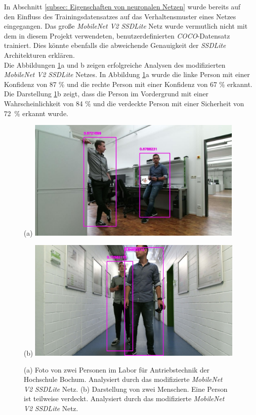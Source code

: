 In Abschnitt \ref{subsec: Eigenschaften von neuronalen Netzen} wurde bereits auf den Einfluss des Trainingsdatensatzes auf das Verhaltensmuster eines Netzes eingegangen. Das große \textit{MobileNet V2 SSDLite} Netz wurde vermutlich nicht mit dem in diesem Projekt verwendeten, benutzerdefinierten \textit{COCO}-Datensatz trainiert. Dies könnte ebenfalls die abweichende Genauigkeit der \textit{SSDLite} Architekturen erklären.\\


Die Abbildungen \ref{fig: owndatat}a und b zeigen erfolgreiche Analysen des modifizierten \textit{MobileNet V2 SSDLite} Netzes. In Abbildung \ref{fig: owndatat}a wurde die linke Person mit einer Konfidenz von 87 \% und die rechte Person mit einer Konfidenz von 67 \% erkannt. Die Darstellung \ref{fig: owndatat}b zeigt, dass die Person im Vordergrund mit einer Wahrscheinlichkeit von 84 \% und die verdeckte Person mit einer Sicherheit von {72~\%} erkannt wurde.  \\

	\begin{figure}[H]
	\centering
	\begin{minipage}[b]{0.49\textwidth}
		(a)
		\includegraphics[width=0.94\textwidth]{Bilder/26t.pdf}
	\end{minipage}
	\hfill
	\begin{minipage}[b]{0.49\textwidth}
		(b)
		\includegraphics[width=0.94\textwidth]{Bilder/39t.jpg}
	\end{minipage}
	\caption{(a) Foto von zwei Personen im Labor für Antriebstechnik der Hochschule Bochum. Analysiert durch das modifizierte \textit{MobileNet V2 SSDLite} Netz. (b) Darstellung von zwei Menschen. Eine Person ist teilweise verdeckt. Analysiert durch das modifizierte \textit{MobileNet V2 SSDLite} Netz.}
	\label{fig: owndatat}
\end{figure}




